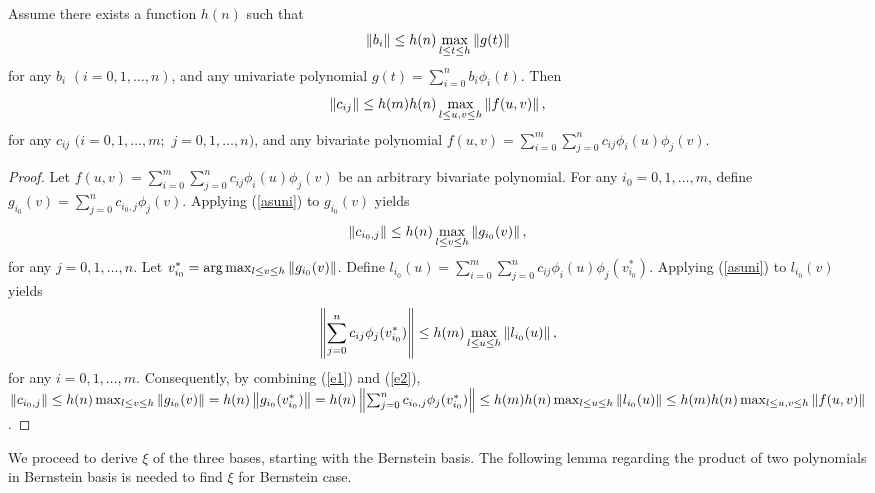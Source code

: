\documentclass[12pt]{article}
\begin{document}
\begin{lemma}
\label{uni_theta_to_bi}
Assume there exists a function $h(n)$ such that
\begin{equation}
\label{asuni}
\left\|b_{i}\right\| \leq h(n) \max_{l \leq t \leq h} \left\|g(t)\right\|
\end{equation}
for any $b_i$ $(i = 0,1,\ldots,n)$, and any univariate polynomial $g(t) = \sum_{i=0}^n b_i \phi_i(t)$.
Then
\begin{equation}
\left\|c_{ij}\right\| \leq h(m)h(n) \max_{l \leq u,v \leq h} \left\|f(u,v)\right\|,
\end{equation}
for any $c_{ij}$ $(i = 0,1,\ldots,m;$ $j=0,1,\ldots,n)$, and any
bivariate polynomial $f(u,v) = \sum_{i=0}^m \sum_{j=0}^n c_{ij} \phi_i(u)\phi_j(v)$.
\begin{proof}




Let $f(u,v) = \sum_{i=0}^m \sum_{j=0}^n c_{ij} \phi_i(u)\phi_j(v)$ be an arbitrary bivariate polynomial.  For any $i_0 = 0, 1, \ldots, m$, define $g_{i_0}(v) = \sum_{j=0}^n c_{i_0, j} \phi_j(v)$.  Applying (\ref{asuni}) to $g_{i_0}(v)$ yields
\begin{equation}
\label{e1}
\left\|c_{i_0,j}\right\| \leq h(n)\max_{l \leq v \leq h} \left\|g_{i_0}(v)\right\|,
\end{equation}
for any $j = 0, 1, \ldots, n$.  Let $v^*_{i_0} = \arg\max_{l \leq v \leq h} \left\|g_{i_0}(v)\right\|$.  Define $l_{i_0}(u) = \sum_{i=0}^m \sum_{j=0}^n c_{ij} \phi_i(u) \phi_j(v^*_{i_0})$.  Applying (\ref{asuni}) to $l_{i_0}(v)$ yields
\begin{equation}
\label{e2}
\left\|\sum_{j=0}^n c_{ij}\phi_j(v^*_{i_0})\right\| \leq h(m)\max_{l \leq u \leq h} \left\|l_{i_0}(u)\right\|,
\end{equation}
for any $i = 0, 1, \ldots, m$.  Consequently, by combining (\ref{e1}) and (\ref{e2}), \\ $\left\|c_{i_0,j}\right\| \leq h(n)\max_{l \leq v \leq h} \left\|g_{i_0}(v)\right\| = h(n) \left\|g_{i_0}(v^*_{i_0})\right\| = h(n)\left\|\sum_{j=0}^n c_{i_0,j}\phi_j(v^*_{i_0})\right\| \leq h(m)h(n)\max_{l \leq u \leq h} \left\|l_{i_0}(u)\right\| \leq h(m)h(n)\max_{l \leq u,v \leq h} \left\|f(u,v)\right\|$.
\end{proof}
\end{lemma}

We proceed to derive $\xi$ of the three bases, starting with the Bernstein basis.
The following lemma regarding the product
of two polynomials in Bernstein basis is needed to find $\xi$
for Bernstein case.
\end{document}
